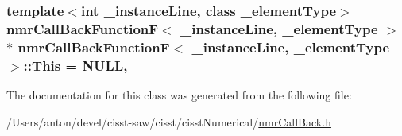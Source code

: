 \subsubsection[{This}]{\setlength{\rightskip}{0pt plus 5cm}template$<$int \+\_\+instance\+Line, class \+\_\+element\+Type$>$ {\bf nmr\+Call\+Back\+Function\+F}$<$ \+\_\+instance\+Line, \+\_\+element\+Type $>$ $\ast$ {\bf nmr\+Call\+Back\+Function\+F}$<$ \+\_\+instance\+Line, \+\_\+element\+Type $>$\+::This = N\+U\+L\+L\hspace{0.3cm}{\ttfamily [static]}, {\ttfamily [protected]}}\label{classnmr_call_back_function_f_aade0d68710d0883015d2908fcd831b82}


The documentation for this class was generated from the following file\+:\begin{DoxyCompactItemize}
\item 
/\+Users/anton/devel/cisst-\/saw/cisst/cisst\+Numerical/\hyperlink{nmr_call_back_8h}{nmr\+Call\+Back.\+h}\end{DoxyCompactItemize}
